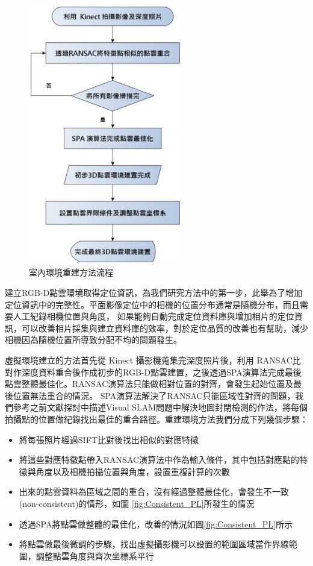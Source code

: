 \begin{figure}
\begin{center}
  \includegraphics[width=0.6\textwidth]{figures/Environment_Building.eps}
  \caption{室內環境重建方法流程}
  \label{fig:Environment Building Process}
\end{center}
\end{figure}

   建立RGB-D點雲環境取得定位資訊，為我們研究方法中的第一步，此舉為了增加定位資訊中的完整性。平面影像定位中的相機的位置分布通常是隨機分布，而且需要人工紀錄相機位置與角度，
如果能夠自動完成定位資料庫與增加相片的定位資訊，可以改善相片採集與建立資料庫的效率，對於定位品質的改善也有幫助，減少相機因為隨機位置所導致分配不均的問題發生。

虛擬環境建立的方法首先從 Kinect 攝影機蒐集完深度照片後，利用
RANSAC比對作深度資料重合後作成初步的RGB-D點雲建置，之後透過SPA演算法完成最後點雲整體最佳化。RANSAC演算法只能做相對位置的對齊，會發生起始位置及最後位置無法重合的情況。
SPA演算法解決了RANSAC只能區域性對齊的問題，我們參考之前文獻探討中描述Visual SLAM問題中解決地圖封閉檢測的作法，將每個拍攝點的位置做紀錄找出最佳的重合路徑。重建環境方法我們分成下列幾個步驟：
   
\begin{itemize}
	\item 將每張照片經過SIFT比對後找出相似的對應特徵
	\item 將這些對應特徵點帶入RANSAC演算法中作為輸入條件，其中包括對應點的特徵與角度以及相機拍攝位置與角度，設置重複計算的次數
	\item 出來的點雲資料為區域之間的重合，沒有經過整體最佳化，會發生不一致(non-consistent)的情形，如圖 \ref{fig:Consistent_PL}所發生的情況
	\item 透過SPA將點雲做整體的最佳化，改善的情況如圖\ref{fig:Consistent_PL}所示
	\item 將點雲做最後微調的步驟，找出虛擬攝影機可以設置的範圍區域當作界線範圍，調整點雲角度與齊次坐標系平行
\end{itemize}
   
